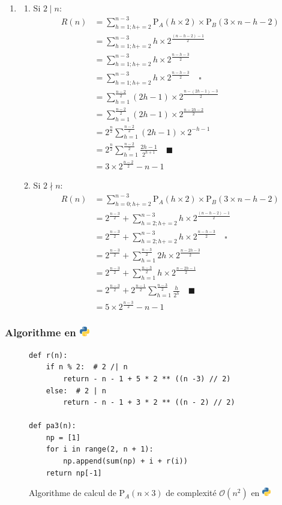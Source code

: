 \documentclass[twoside, a4paper, 12pt]{report}
\newcommand{\pythonlogo}{\includegraphics[width=1em , height=2ex]{python128.png}}
\newcommand{\cqfd}[1][\quad]{\ensuremath{#1\blacksquare}}
\newcommand{\subcqfd}[1][\quad]{\ensuremath{#1\square}}
\newcommand{\pa}[2]{\ensuremath{\text{P}_A\left(#1 \times #2\right)}}
\newcommand{\pb}[2]{\ensuremath{\text{P}_B\left(#1 \times #2\right)}}
\begin{document}
\begin{enumerate}
\item
\begin{enumerate}
\item Si $2\mid n$:
\begin{align}
R(n) &= \sum_{h=1; h += 2}^{n-3} \pa{h}{2} \times \pb{3}{n-h-2} \\
&= \sum_{h=1; h += 2}^{n-3} h \times 2^{\frac{(n-h-2) - 1}{2}} \\
&= \sum_{h=1; h += 2}^{n-3} h \times 2^{\frac{n-h-3}{2}} \\
&= \sum_{h=1; h += 2}^{n-3} h \times 2^{\frac{n-h-3}{2}} \subcqfd\\
&= \sum_{h=1}^{\frac{n-2}{2}} (2h-1) \times 2^{\frac{n-(2h-1)-3}{2}} \\
&= \sum_{h=1}^{\frac{n-2}{2}} (2h-1) \times 2^{\frac{n-2h-2}{2}} \\
&= 2^{\frac{n}{2}}\sum_{h=1}^{\frac{n-2}{2}} (2h-1) \times 2^{-h-1}\\
&= 2^{\frac{n}{2}}\sum_{h=1}^{\frac{n-2}{2}} \frac{2h-1}{2^{h+1}}  \cqfd\\
&= 3 \times 2^{\frac{n-2}{2}} - n - 1
\end{align}

\item Si $2\nmid n$:
\begin{align}
R(n) &= \sum_{h=0; h += 2}^{n-3} \pa{h}{2} \times \pb{3}{n-h-2} \\
&= 2^{\frac{n-3}{2}} + \sum_{h=2; h += 2}^{n-3} h \times 2^{\frac{(n-h-2) - 1}{2}} \\
&= 2^{\frac{n-3}{2}} + \sum_{h=2; h += 2}^{n-3} h \times 2^{\frac{n-h-3}{2}} \subcqfd\\
&= 2^{\frac{n-3}{2}} + \sum_{h=1}^{\frac{n-3}{2}} 2h \times 2^{\frac{n-2h-3}{2}} \\
&= 2^{\frac{n-3}{2}} + \sum_{h=1}^{\frac{n-3}{2}} h \times 2^{\frac{n-2h-1}{2}} \\
&= 2^{\frac{n-3}{2}} +  2^{\frac{n-1}{2}}\sum_{h=1}^{\frac{n-3}{2}} \frac{h}{2^h} \cqfd\\
&= 5 \times 2^{\frac{n - 3}{2}}  - n - 1
\end{align}
\end{enumerate}

\end{enumerate}

\newpage
\subsubsection[Algorithme en Python]{Algorithme en \pythonlogo}
\begin{figure}[h]
\begin{lstlisting}[frame=single]
def r(n):
    if n % 2:  # 2 /| n
        return - n - 1 + 5 * 2 ** ((n -3) // 2)
    else:  # 2 | n
        return - n - 1 + 3 * 2 ** ((n - 2) // 2) 

def pa3(n):
    np = [1]
    for i in range(2, n + 1):
        np.append(sum(np) + i + r(i))
    return np[-1]
\end{lstlisting}
\caption[Algorithme de calcul de \pa{n}{3 } en Python]{Algorithme de calcul de \pa{n}{3} de complexité $\mathcal{O} (n^2)$ en \pythonlogo}
\label{algorithme_pa3}
\end{figure}
\end{document}
